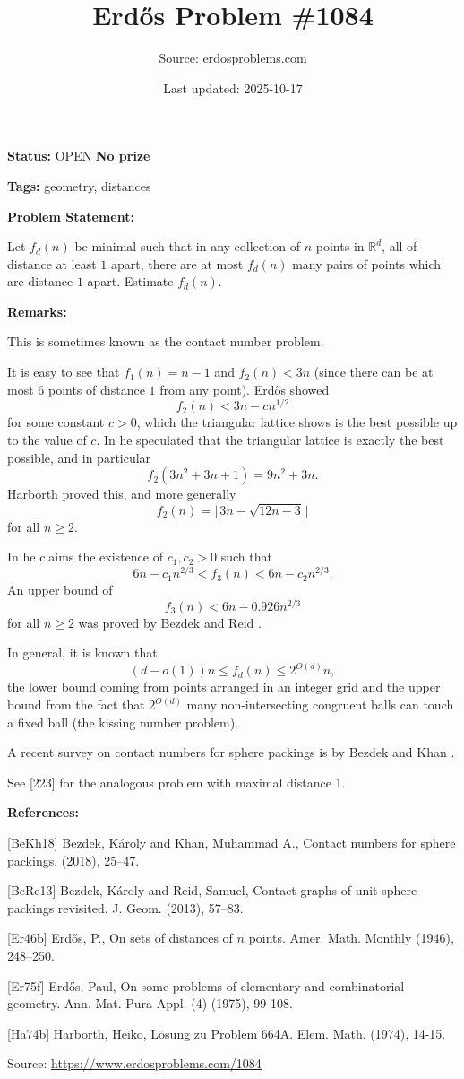 \documentclass{article}
\title{Erd\H{o}s Problem \#1084}
\date{Last updated: 2025-10-17}
\author{Source: erdosproblems.com}
\begin{document}
\maketitle

\noindent\textbf{Status:} OPEN \quad \textbf{No prize}

\noindent\textbf{Tags:} geometry, distances

\medskip
\noindent\textbf{Problem Statement:}

Let $f_d(n)$ be minimal such that in any collection of $n$ points in $\mathbb{R}^d$, all of distance at least $1$ apart, there are at most $f_d(n)$ many pairs of points which are distance $1$ apart. Estimate $f_d(n)$.

\bigskip
\noindent\textbf{Remarks:}

This is sometimes known as the contact number problem.

It is easy to see that $f_1(n)=n-1$ and $f_2(n)<3n$ (since there can be at most $6$ points of distance $1$ from any point). Erd\H{o}s \cite{Er46b} showed\[f_2(n)<3n-cn^{1/2}\]for some constant $c>0$, which the triangular lattice shows is the best possible up to the value of $c$. In \cite{Er75f} he speculated that the triangular lattice is exactly the best possible, and in particular\[f_2(3n^2+3n+1)=9n^2+3n.\]Harborth \cite{Ha74b} proved this, and more generally\[f_2(n)=\lfloor 3n-\sqrt{12n-3}\rfloor\]for all $n\geq 2$.

In \cite{Er75f} he claims the existence of $c_1,c_2>0$ such that\[6n-c_1n^{2/3}< f_3(n) < 6n-c_2n^{2/3}.\]An upper bound of\[f_3(n) < 6n-0.926n^{2/3}\]for all $n\geq 2$ was proved by Bezdek and Reid \cite{BeRe13}.

In general, it is known that\[(d-o(1))n \leq f_d(n) \leq 2^{O(d)}n,\]the lower bound coming from points arranged in an integer grid and the upper bound from the fact that $2^{O(d)}$ many non-intersecting congruent balls can touch a fixed ball (the kissing number problem).

A recent survey on contact numbers for sphere packings is by Bezdek and Khan \cite{BeKh18}.

See [223] for the analogous problem with maximal distance $1$.

\bigskip
\noindent\textbf{References:}

[BeKh18] Bezdek, K\'{a}roly and Khan, Muhammad A., Contact numbers for sphere packings. (2018), 25--47.
 
 [BeRe13] Bezdek, K\'{a}roly and Reid, Samuel, Contact graphs of unit sphere packings revisited. J. Geom. (2013), 57--83.
 
 [Er46b] Erd\H{o}s, P., On sets of distances of {$n$} points. Amer. Math. Monthly (1946), 248--250.
 
 [Er75f] Erd\H{o}s, Paul, On some problems of elementary and combinatorial geometry. Ann. Mat. Pura Appl. (4) (1975), 99-108.
 
 [Ha74b] Harborth, Heiko, L\"{o}sung zu Problem 664A. Elem. Math. (1974), 14-15.

\bigskip
\noindent\small{Source: \url{https://www.erdosproblems.com/1084}}
\end{document}

